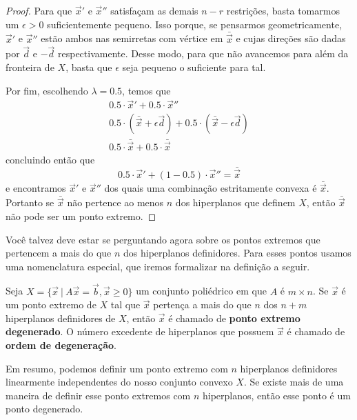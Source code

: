\begin{thm:ponto extremo}
\begin{proof}
		Para que $\vec{x}'$ e $\vec{x}''$ satisfaçam as demais $n - r$ restrições, basta tomarmos um $\epsilon > 0$ suficientemente pequeno. Isso porque, se pensarmos geometricamente,  $\vec{x}'$ e $\vec{x}''$ estão ambos nas semirretas com vértice em $\bar{\vec{x}}$ e cujas direções são dadas por $\vec{d}$ e $-\vec{d}$ respectivamente. Desse modo, para que não avancemos para além da fronteira de $X$, basta que $\epsilon$ seja pequeno o suficiente para tal.

		Por fim, escolhendo $\lambda = 0.5$, temos que
		\begin{gather*}
			0.5 \cdot \vec{x}' + 0.5 \cdot \vec{x}'' \\
			0.5 \cdot (\bar{\vec{x}} + \epsilon \vec{d}) +
			0.5 \cdot (\bar{\vec{x}} - \epsilon \vec{d}) \\
			0.5 \cdot \bar{\vec{x}} + 0.5 \cdot \bar{\vec{x}}
		\end{gather*}
		concluindo então que
		\begin{equation*}
			0.5 \cdot \vec{x}' + (1 - 0.5) \cdot \vec{x}'' = \bar{\vec{x}}
		\end{equation*}
		e encontramos $\vec{x}'$ e $\vec{x}''$ dos quais uma combinação estritamente convexa é $\bar{\vec{x}}$. Portanto se $\bar{\vec{x}}$ não pertence ao menos $n$ dos hiperplanos que definem $X$, então $\bar{\vec{x}}$ não pode ser um ponto extremo.
	\end{proof}
\end{thm:ponto extremo}

Você talvez deve estar se perguntando agora sobre os pontos extremos que pertencem a mais do que $n$ dos hiperplanos definidores. Para esses pontos usamos uma nomenclatura especial, que iremos formalizar na definição a seguir.

\begin{def:ponto degenerado}
	Seja $X = \{\vec{x}\ |\ A\vec{x} = \vec{b}, \vec{x} \geq 0\}$ um conjunto poliédrico em que $A$ é $m \times n$. Se $\vec{x}$ é um ponto extremo de $X$ tal que $\vec{x}$ pertença a mais do que $n$ dos $n + m$ hiperplanos definidores de $X$, então $\vec{x}$ é chamado de \textbf{ponto extremo degenerado}. O número excedente de hiperplanos que possuem $\vec{x}$ é chamado de \textbf{ordem de degeneração}.
\end{def:ponto degenerado}

Em resumo, podemos definir um ponto extremo com $n$ hiperplanos definidores linearmente independentes do nosso conjunto convexo $X$. Se existe mais de uma maneira de definir esse ponto extremos com $n$ hiperplanos, então esse ponto é um ponto degenerado.

